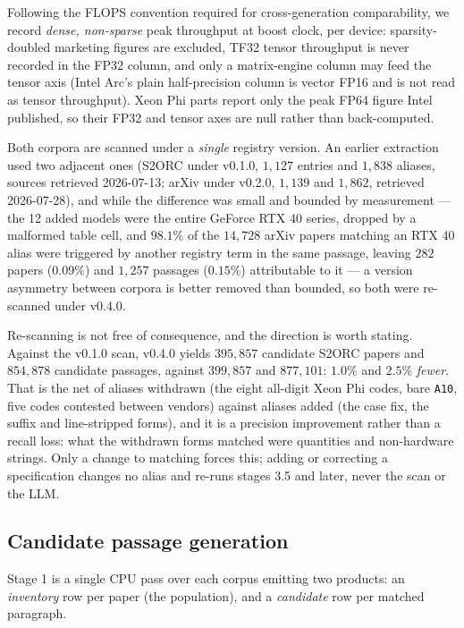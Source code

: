 Following the FLOPS convention required for cross-generation comparability, we
record \emph{dense, non-sparse} peak throughput at boost clock, per device:
sparsity-doubled marketing figures are excluded, TF32 tensor throughput is never
recorded in the FP32 column, and only a matrix-engine column may feed the tensor
axis (Intel Arc's plain half-precision column is vector FP16 and is not read as
tensor throughput). Xeon Phi parts report only the peak FP64 figure Intel
published, so their FP32 and tensor axes are null rather than back-computed.

Both corpora are scanned under a \emph{single} registry version. An earlier
extraction used two adjacent ones (S2ORC under v0.1.0, $1{,}127$ entries and
$1{,}838$ aliases, sources retrieved 2026-07-13; arXiv under v0.2.0, $1{,}139$ and
$1{,}862$, retrieved 2026-07-28), and while the difference was small and bounded by
measurement --- the 12 added models were the entire GeForce RTX 40 series, dropped
by a malformed table cell, and $98.1\%$ of the $14{,}728$ arXiv papers matching an
RTX 40 alias were triggered by another registry term in the same passage, leaving
$282$ papers ($0.09\%$) and $1{,}257$ passages ($0.15\%$) attributable to
it --- a version asymmetry between corpora is better removed than bounded, so both
were re-scanned under v0.4.0.

Re-scanning is not free of consequence, and the direction is worth stating.
Against the v0.1.0 scan, v0.4.0 yields $395{,}857$ candidate S2ORC papers and
$854{,}878$ candidate passages, against $399{,}857$ and $877{,}101$: $1.0\%$ and
$2.5\%$ \emph{fewer}. That is the net of aliases withdrawn (the eight all-digit
Xeon Phi codes, bare \texttt{A10}, five codes contested between vendors) against
aliases added (the case fix, the suffix and line-stripped forms), and it is a
precision improvement rather than a recall loss: what the withdrawn forms matched
were quantities and non-hardware strings. Only a change to matching forces this;
adding or correcting a specification changes no alias and re-runs stages 3.5 and
later, never the scan or the LLM.

\subsection{Candidate passage generation}

Stage 1 is a single CPU pass over each corpus emitting two products: an
\emph{inventory} row per paper (the population), and a \emph{candidate} row per
matched paragraph.


